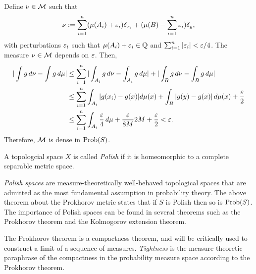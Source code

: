 \documentclass[a4paper]{article}
\begin{document}
\begin{pf}
Define $\nu\in\mathcal{M}$ such that
\[\nu:=\sum_{i=1}^n(\mu(A_i)+\varepsilon_i)\delta_{x_i}+(\mu(B)-\sum_{i=1}^n\varepsilon_i)\delta_y,\]
with perturbations $\varepsilon_i$ such that $\mu(A_i)+\varepsilon_i\in\mathbb{Q}$ and $\sum_{i=1}^n|\varepsilon_i|<\varepsilon/4$.
The measure $\nu\in\mathcal{M}$ depends on $\varepsilon$.
Then,
\begin{align*}
|\int g\,d\nu-\int g\,d\mu|
&\le\sum_{i=1}^n|\int_{A_i}g\,d\nu-\int_{A_i}g\,d\mu|+|\int_Bg\,d\nu-\int_Bg\,d\mu|\\
&\le\sum_{i=1}^n\int_{A_i}|g(x_i)-g(x)|d\mu(x)+\int_B|g(y)-g(x)|\,d\mu(x)+\frac{\varepsilon}2\\
&\le\sum_{i=1}^n\int_{A_i}\frac{\varepsilon}4\,d\mu+\frac{\varepsilon}{8M}2M+\frac{\varepsilon}2<\varepsilon.
\end{align*}
Therefore, $\mathcal{M}$ is dense in $\operatorname{Prob}(S)$.
\end{pf}

\begin{defn}
A topologcial space $X$ is called \emph{Polish} if it is homeomorphic to a complete separable metric space.
\end{defn}

\emph{Polish spaces} are measure-theoretically well-behaved topological spaces that are admitted as the most fundamental assumption in probability theory.
The above theorem about the Prokhorov metric states that if $S$ is Polish then so is $\operatorname{Prob}(S)$.
The importance of Polish spaces can be found in several theorems such as the Prokhorov theorem and the Kolmogorov extension theorem.

The Prokhorov theorem is a compactness theorem, and will be critically used to construct a limit of a sequence of measures.
\emph{Tightness} is the measure-theoretic paraphrase of the compactness in the probability measure space according to the Prokhorov theorem.
\end{document}
